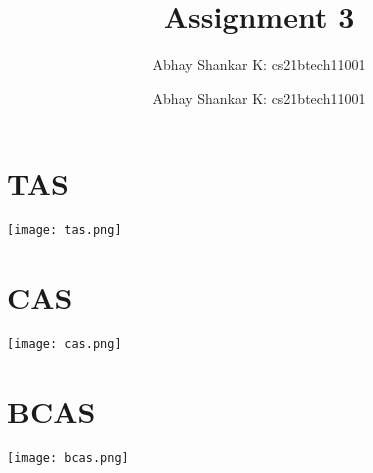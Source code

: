 \documentclass{amsart}
\author{Abhay Shankar K: cs21btech11001}
\newcommand{\me}{
    \author{Abhay Shankar K: cs21btech11001}
    \maketitle
}
\begin{document}
\title{Assignment 3}
\me

\section{TAS} 

\texttt{[image: tas.png]}

\section{CAS} 

\texttt{[image: cas.png]}

\section{BCAS} 

\texttt{[image: bcas.png]}
\end{document}
